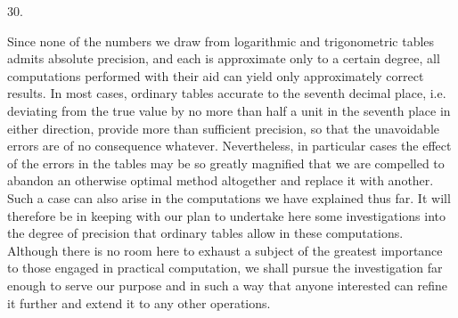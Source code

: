 \par{}
\begin{center}
30.
\end{center}
Since none of the numbers we draw from logarithmic and trigonometric tables admits absolute precision, and each is approximate only to a certain degree, all computations performed with their aid can yield only approximately correct results. In most cases, ordinary tables accurate to the seventh decimal place, i.e. deviating from the true value by no more than half a unit in the seventh place in either direction, provide more than sufficient precision, so that the unavoidable errors are of no consequence whatever. Nevertheless, in particular cases the effect of the errors in the tables may be so greatly magnified that we are compelled to abandon an otherwise optimal method altogether and replace it with another. Such a case can also arise in the computations we have explained thus far. It will therefore be in keeping with our plan to undertake here some investigations into the degree of precision that ordinary tables allow in these computations. Although there is no room here to exhaust a subject of the greatest importance to those engaged in practical computation, we shall pursue the investigation far enough to serve our purpose and in such a way that anyone interested can refine it further and extend it to any other operations.

